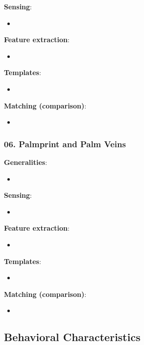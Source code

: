 \documentclass[a4paper]{article}
\begin{document}
      \textbf{Sensing}:
      \begin{itemize}
        \item 
      \end{itemize}

      \textbf{Feature extraction}:
      \begin{itemize}
        \item 
      \end{itemize}

      \textbf{Templates}:
      \begin{itemize}
        \item 
      \end{itemize}

      \textbf{Matching (comparison)}:
      \begin{itemize}
        \item 
      \end{itemize}
    \subsubsection*{06. Palmprint and Palm Veins}
      \textbf{Generalities}:
      \begin{itemize}
        \item 
      \end{itemize}

      \textbf{Sensing}:
      \begin{itemize}
        \item 
      \end{itemize}

      \textbf{Feature extraction}:
      \begin{itemize}
        \item 
      \end{itemize}

      \textbf{Templates}:
      \begin{itemize}
        \item 
      \end{itemize}

      \textbf{Matching (comparison)}:
      \begin{itemize}
        \item 
      \end{itemize}
  \subsection*{Behavioral Characteristics}
\end{document}
